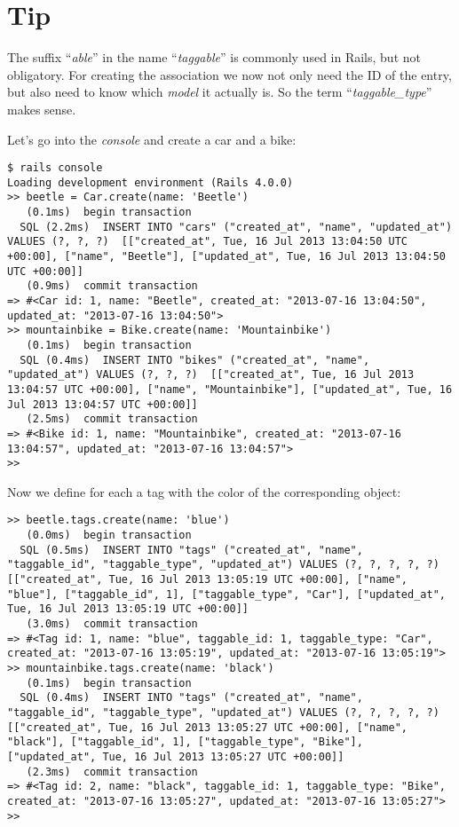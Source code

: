 \documentclass[a4paper]{book}
\begin{document}
\section{Tip}\label{tip-9}

The suffix “\emph{able}” in the name “\emph{taggable}” is commonly used in Rails, but not obligatory. For creating the association we now not only need the ID of the entry, but also need to know which \emph{model} it actually is. So the term “\emph{taggable\_type}” makes sense.

Let's go into the \emph{console} and create a car and a bike:

\begin{shaded}\begin{verbatim}
$ rails console
Loading development environment (Rails 4.0.0)
>> beetle = Car.create(name: 'Beetle')
   (0.1ms)  begin transaction
  SQL (2.2ms)  INSERT INTO "cars" ("created_at", "name", "updated_at") VALUES (?, ?, ?)  [["created_at", Tue, 16 Jul 2013 13:04:50 UTC +00:00], ["name", "Beetle"], ["updated_at", Tue, 16 Jul 2013 13:04:50 UTC +00:00]]
   (0.9ms)  commit transaction
=> #<Car id: 1, name: "Beetle", created_at: "2013-07-16 13:04:50", updated_at: "2013-07-16 13:04:50">
>> mountainbike = Bike.create(name: 'Mountainbike')
   (0.1ms)  begin transaction
  SQL (0.4ms)  INSERT INTO "bikes" ("created_at", "name", "updated_at") VALUES (?, ?, ?)  [["created_at", Tue, 16 Jul 2013 13:04:57 UTC +00:00], ["name", "Mountainbike"], ["updated_at", Tue, 16 Jul 2013 13:04:57 UTC +00:00]]
   (2.5ms)  commit transaction
=> #<Bike id: 1, name: "Mountainbike", created_at: "2013-07-16 13:04:57", updated_at: "2013-07-16 13:04:57">
>>
\end{verbatim}\end{shaded}

Now we define for each a tag with the color of the corresponding object:

\begin{shaded}\begin{verbatim}
>> beetle.tags.create(name: 'blue')
   (0.0ms)  begin transaction
  SQL (0.5ms)  INSERT INTO "tags" ("created_at", "name", "taggable_id", "taggable_type", "updated_at") VALUES (?, ?, ?, ?, ?)  [["created_at", Tue, 16 Jul 2013 13:05:19 UTC +00:00], ["name", "blue"], ["taggable_id", 1], ["taggable_type", "Car"], ["updated_at", Tue, 16 Jul 2013 13:05:19 UTC +00:00]]
   (3.0ms)  commit transaction
=> #<Tag id: 1, name: "blue", taggable_id: 1, taggable_type: "Car", created_at: "2013-07-16 13:05:19", updated_at: "2013-07-16 13:05:19">
>> mountainbike.tags.create(name: 'black')
   (0.1ms)  begin transaction
  SQL (0.4ms)  INSERT INTO "tags" ("created_at", "name", "taggable_id", "taggable_type", "updated_at") VALUES (?, ?, ?, ?, ?)  [["created_at", Tue, 16 Jul 2013 13:05:27 UTC +00:00], ["name", "black"], ["taggable_id", 1], ["taggable_type", "Bike"], ["updated_at", Tue, 16 Jul 2013 13:05:27 UTC +00:00]]
   (2.3ms)  commit transaction
=> #<Tag id: 2, name: "black", taggable_id: 1, taggable_type: "Bike", created_at: "2013-07-16 13:05:27", updated_at: "2013-07-16 13:05:27">
>>
\end{verbatim}\end{shaded}
\end{document}
